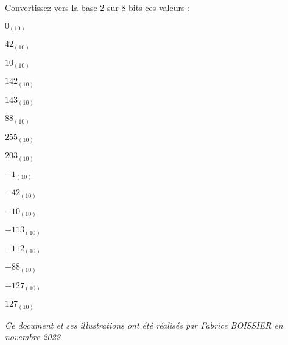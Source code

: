 \documentclass[11pt,a4paper]{article}
\begin{document}
\bigskip

Convertissez vers la base 2 sur 8 bits ces valeurs :

\bigskip


\begin{table}[h!]
  \centering
  \begin{minipage}{0.45\textwidth}
$ 0_{(10)} $

\bigskip

$ 42_{(10)} $

\bigskip

$ 10_{(10)} $

\bigskip

$ 142_{(10)} $

\bigskip

$ 143_{(10)} $

\bigskip

$ 88_{(10)} $

\bigskip

$ 255_{(10)} $

\bigskip

$ 203_{(10)} $
  \end{minipage}
  \hfillx
  \begin{minipage}{0.5\textwidth}
$ -1_{(10)} $

\bigskip

$ -42_{(10)} $

\bigskip

$ -10_{(10)} $

\bigskip

$ -113_{(10)} $

\bigskip

$ -112_{(10)} $

\bigskip

$ -88_{(10)} $

\bigskip

$ -127_{(10)} $

\bigskip

$ 127_{(10)} $

  \end{minipage}
\end{table}






\bigskip




\begin{center}
\textit{Ce document et ses illustrations ont été réalisés par Fabrice BOISSIER en novembre 2022}
\end{center}
\end{document}
